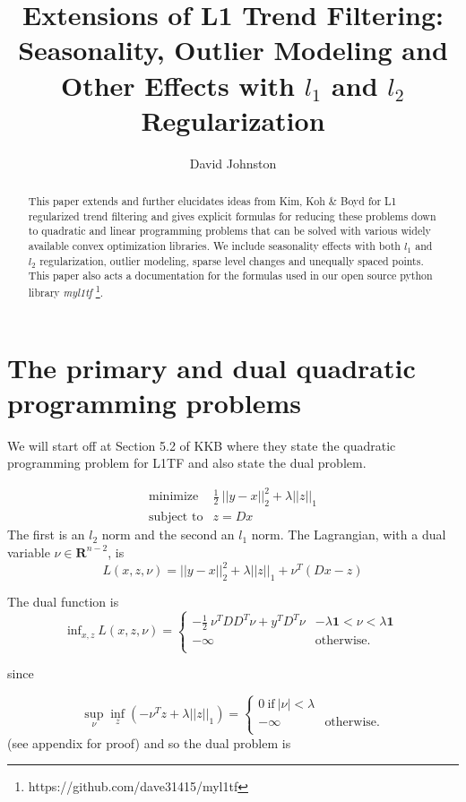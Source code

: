 \documentclass{article}
\begin{document}
\title{Extensions of L1 Trend Filtering: Seasonality, Outlier Modeling
and Other Effects with $l_1$ and $l_2$ Regularization}
\author{David Johnston}

\maketitle

\begin{abstract}
This paper extends and further elucidates ideas from Kim, Koh \& Boyd for L1 regularized
trend filtering and gives explicit formulas for reducing these problems down to
quadratic and linear programming problems that can be solved with various widely available
convex optimization libraries. We include seasonality effects with both
$l_1$ and $l_2$ regularization, outlier modeling, sparse level changes and
unequally spaced points. This paper also acts a documentation for the formulas used
in our open source python library \emph{myl1tf}
\footnote{https://github.com/dave31415/myl1tf}.
\end{abstract}

\section{The primary and dual quadratic programming problems}

We will start off at Section 5.2 of KKB where they state the quadratic programming problem for L1TF
and also state the dual problem.

\begin{eqnarray}
\mbox{minimize} & \frac{1}{2} ~ || y - x ||_2^2  + \lambda ||z||_1 \\
\mbox{subject to} & z = D x
\end{eqnarray}
The first is an $l_2$ norm and the second an $l_1$ norm. The Lagrangian, with a dual variable $\nu \in \mathbf{R}^{n-2}$, is
\[
L(x,z,\nu) =  || y - x ||_2^2  + \lambda ||z||_1 + \nu^T (D x -z)
\]


The dual function is
\[
\mbox{inf}_{x,z} ~ L(x,z,\nu) =
    \left\{
    \begin{array}{ll}
    - \frac{1}{2} ~ \nu^T D D^T \nu + y^T D^T \nu &  - \lambda \mathbf{1} < \nu < \lambda \mathbf{1} \\
  -\infty  & \mbox{otherwise.} \\
  \end{array}
  \right.
\]

since

\begin{equation}
\sup_\nu \inf_z \left(-\nu^T z + \lambda ||z||_1 \right) =
\left\{
    \begin{array}{ll}
   0 ~\mbox{if}~ |\nu| < \lambda \\
  -\infty  & \mbox{otherwise.} \\
  \end{array}
  \right. \label{eq:supinf}
\end{equation}
(see appendix for proof) and so the dual problem is
\end{document}
